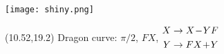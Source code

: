 \documentclass[final]{beamer}
\newcommand{\nt}{\negthinspace}
\newcommand{\m}{\nt-\nt}
\newcommand{\p}{\nt+\nt}
\begin{document}
\begin{frame}{}
\texttt{[image: shiny.png]}
\begin{textblock}{20}(10.52,19.2)
Dragon curve: $\pi/2$, $FX$,
{\small
$\begin{aligned}
X &\to X\m YF \\
Y &\to FX\p Y
\end{aligned}$}
\end{textblock}
\end{frame}
\end{document}
